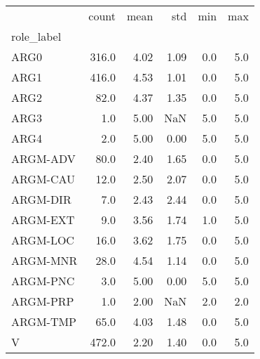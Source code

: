 \begin{tabular}{lrrrrr}
\toprule
{} &  count &  mean &   std &  min &  max \\
role\_label &        &       &       &      &      \\
\midrule
ARG0       &  316.0 &  4.02 &  1.09 &  0.0 &  5.0 \\
ARG1       &  416.0 &  4.53 &  1.01 &  0.0 &  5.0 \\
ARG2       &   82.0 &  4.37 &  1.35 &  0.0 &  5.0 \\
ARG3       &    1.0 &  5.00 &   NaN &  5.0 &  5.0 \\
ARG4       &    2.0 &  5.00 &  0.00 &  5.0 &  5.0 \\
ARGM-ADV   &   80.0 &  2.40 &  1.65 &  0.0 &  5.0 \\
ARGM-CAU   &   12.0 &  2.50 &  2.07 &  0.0 &  5.0 \\
ARGM-DIR   &    7.0 &  2.43 &  2.44 &  0.0 &  5.0 \\
ARGM-EXT   &    9.0 &  3.56 &  1.74 &  1.0 &  5.0 \\
ARGM-LOC   &   16.0 &  3.62 &  1.75 &  0.0 &  5.0 \\
ARGM-MNR   &   28.0 &  4.54 &  1.14 &  0.0 &  5.0 \\
ARGM-PNC   &    3.0 &  5.00 &  0.00 &  5.0 &  5.0 \\
ARGM-PRP   &    1.0 &  2.00 &   NaN &  2.0 &  2.0 \\
ARGM-TMP   &   65.0 &  4.03 &  1.48 &  0.0 &  5.0 \\
V          &  472.0 &  2.20 &  1.40 &  0.0 &  5.0 \\
\bottomrule
\end{tabular}
